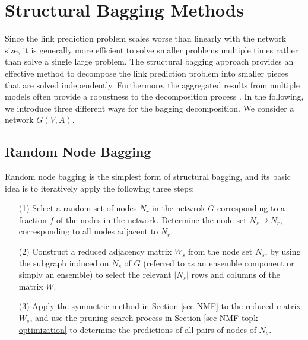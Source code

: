 \section{Structural Bagging Methods}
\label{sec-bagging}
Since the link prediction problem scales worse than
linearly with the network size, it is generally more efficient to
solve smaller problems multiple times rather than solve a single
large problem.
The structural bagging approach provides an effective method to decompose
the link prediction problem into smaller pieces that are solved
independently.
Furthermore, the aggregated results from multiple models often
provide a robustness to the decomposition process  \cite{Breiman96b-1996}. In the
following, we introduce three different ways for the bagging decomposition.
We consider a network $G(V, A)$.


\subsection{Random Node Bagging}

Random node bagging is the simplest form of structural bagging, and its basic
idea is to iteratively apply the following three steps:

\vspace{-1ex}
\begin{enumerate}

\item[(1)] Select a random set of nodes $N_r$ in the netwrok $G$ corresponding to
a fraction $f$ of the nodes in the network. Determine the node set
$N_s \supseteq N_r$, corresponding to all nodes adjacent to $N_r$.


\item[(2)]  Construct a reduced adjacency matrix $W_s$ from the node set $N_s$, by using the subgraph
induced on $N_s$ of $G$ (referred to as an ensemble component or simply an ensemble) to select the relevant $|N_s|$ rows and columns of the matrix $W$.

\item[(3)]  Apply the symmetric \NMF method in Section \ref{sec-NMF} to the reduced matrix $W_s$, and use the  pruning search
process in Section \ref{sec-NMF-topk-optimization} to determine the predictions of all pairs of nodes of $N_s$.
\end{enumerate}
\vspace{-1ex}


